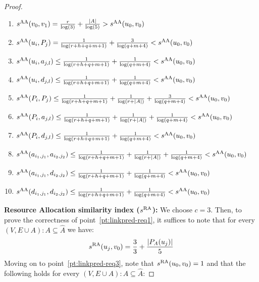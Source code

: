 \documentclass[twocolumn]{article}
\newcommand{\FA}{\widehat{A}}
\newcommand{\PA}{P_{A}}
\newcommand{\sAA}{s^{\text{\normalfont AA}}}
\newcommand{\sRA}{s^{\text{\normalfont RA}}}
\begin{document}
\begin{proof}
\begin{enumerate}[label=(\roman*),leftmargin=*]\itemsep0.4em
\item $\sAA(v_0,v_1)=\frac{r}{\log(3)}+\frac{|A|}{\log(5)} > \sAA(u_0,v_0)$
\item $\sAA(u_i,P_j) = \frac{1}{\log(r+h+q+m+1)} + \frac{3}{\log(q+m+4)} < \sAA(u_0,v_0)$
\item $\sAA(u_i,a_{j,l}) \leq \frac{1}{\log(r+h+q+m+1)} + \frac{1}{\log(q+m+4)} < \sAA(u_0,v_0)$
\item $\sAA(u_i,d_{j,l}) \leq \frac{1}{\log(r+h+q+m+1)} + \frac{1}{\log(q+m+4)} < \sAA(u_0,v_0)$
\item $\sAA(P_i,P_j) \leq \frac{1}{\log(r+h+q+m+1)} + \frac{1}{\log(r+|A|)} + \frac{3}{\log(q+m+4)} < \sAA(u_0,v_0)$
\item $\sAA(P_i,a_{j,l}) \leq \frac{1}{\log(r+h+q+m+1)} + \frac{1}{\log(r+|A|)} + \frac{1}{\log(q+m+4)} < \sAA(u_0,v_0)$
\item $\sAA(P_i,d_{j,l}) \leq \frac{1}{\log(r+h+q+m+1)} + \frac{1}{\log(q+m+4)} < \sAA(u_0,v_0)$
\item $\sAA(a_{i_1,j_1},a_{i_2,j_2}) \leq \frac{1}{\log(r+h+q+m+1)} + \frac{1}{\log(r+|A|)} + \frac{1}{\log(q+m+4)} < \sAA(u_0,v_0)$
\item $\sAA(a_{i_1,j_1},d_{i_2,j_2}) \leq \frac{1}{\log(r+h+q+m+1)} + \frac{1}{\log(q+m+4)} < \sAA(u_0,v_0)$
\item $\sAA(d_{i_1,j_1},d_{i_2,j_2}) \leq \frac{1}{\log(r+h+q+m+1)} + \frac{1}{\log(q+m+4)} < \sAA(u_0,v_0)$
\end{enumerate}

\noindent \textbf{Resource Allocation similarity index ($\sRA$):} We choose $c=3$.
Then, to prove the correctness of point~\ref{pt:linkpred-req1}, it suffices to note that for every $(V,E\cup A):A \subseteq \FA$ we have: $$
\sRA(u_j,v_0)=\frac{3}{3}+\frac{|\PA(u_j)|}{5}
$$
Moving on to point~\ref{pt:linkpred-req3}, note that $\sRA(u_0,v_0) = 1$ and that the following holds for every $(V,E\cup A):A \subseteq \FA$:


\end{proof}
\end{document}
